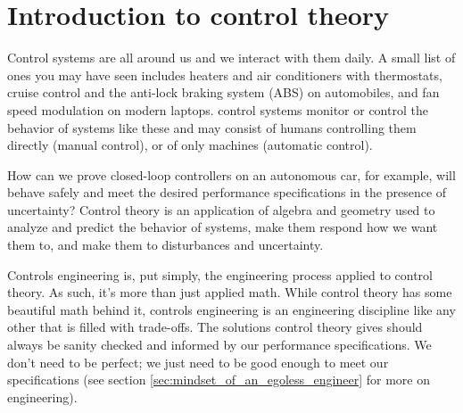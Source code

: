 
\chapter{Introduction to control theory}

Control systems are all around us and we interact with them daily. A small list
of ones you may have seen includes heaters and air conditioners with
thermostats, cruise control and the anti-lock braking system (ABS) on
automobiles, and fan speed modulation on modern laptops. \Glspl{control system}
monitor or control the behavior of \glspl{system} like these and may consist of
humans controlling them directly (manual control), or of only machines
(automatic control).

How can we prove closed-loop \glspl{controller} on an autonomous car, for
example, will behave safely and meet the desired performance specifications in
the presence of uncertainty? Control theory is an application of algebra and
geometry used to analyze and predict the behavior of \glspl{system}, make them
respond how we want them to, and make them  to
\glspl{disturbance} and uncertainty.

Controls engineering is, put simply, the engineering process applied to control
theory. As such, it's more than just applied math. While control theory has some
beautiful math behind it, controls engineering is an engineering discipline like
any other that is filled with trade-offs. The solutions control theory gives
should always be sanity checked and informed by our performance specifications.
We don't need to be perfect; we just need to be good enough to meet our
specifications (see section \ref{sec:mindset_of_an_egoless_engineer} for more on
engineering).

\renewcommand*{\chapterpath}{\partpath/introduction-to-control-theory}

